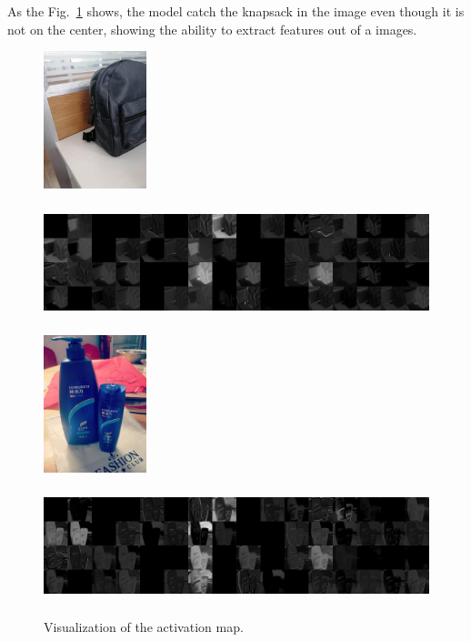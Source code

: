 As the Fig.~\ref{fig:actmap} shows, the model catch the knapsack in the image even though it is not on the center, showing the ability to
extract features out of a images.

\begin{figure}[H]
  \begin{minipage}[b]{\linewidth}
    \centering
    \includegraphics[height=4cm]{figs/img_7224.jpg}
  \end{minipage}
  \begin{minipage}[b]{\linewidth}
    \centering
    \includegraphics[height=4cm]{figs/ReLU_2.jpg}
    \vspace{2mm}
  \end{minipage}
  \begin{minipage}{\linewidth}
    \centering
    \includegraphics[height=4cm]{figs/img_12875.jpg}
  \end{minipage}
  \begin{minipage}[b]{\linewidth}
    \centering
    \includegraphics[height=4cm]{figs/12875_ReLU_2.jpg}
  \end{minipage}
  \caption{Visualization of the activation map.}
  \label{fig:actmap}
\end{figure}
